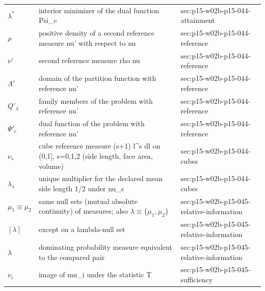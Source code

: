\begin{longtable}{@{}p{}p{}p{}@{}}
\(\lambda^*\) & interior minimizer of the dual function Psi\_c & sec:\allowbreak{}p15-\allowbreak{}w02b-\allowbreak{}p15-\allowbreak{}044-\allowbreak{}attainment \\
\(\rho\) & positive density of a second reference measure nu' with respect to nu & sec:\allowbreak{}p15-\allowbreak{}w02b-\allowbreak{}p15-\allowbreak{}044-\allowbreak{}reference \\
\(\nu'\) & second reference measure rho nu & sec:\allowbreak{}p15-\allowbreak{}w02b-\allowbreak{}p15-\allowbreak{}044-\allowbreak{}reference \\
\(\Lambda'\) & domain of the partition function with reference nu' & sec:\allowbreak{}p15-\allowbreak{}w02b-\allowbreak{}p15-\allowbreak{}044-\allowbreak{}reference \\
\(Q'_\lambda\) & family members of the problem with reference nu' & sec:\allowbreak{}p15-\allowbreak{}w02b-\allowbreak{}p15-\allowbreak{}044-\allowbreak{}reference \\
\(\Psi'_c\) & dual function of the problem with reference nu' & sec:\allowbreak{}p15-\allowbreak{}w02b-\allowbreak{}p15-\allowbreak{}044-\allowbreak{}reference \\
\(\nu_s\) & cube reference measure (s+1) l\^{}s dl on (0,1], s=0,1,2 (side length, face area, volume) & sec:\allowbreak{}p15-\allowbreak{}w02b-\allowbreak{}p15-\allowbreak{}044-\allowbreak{}cubes \\
\(\lambda_s\) & unique multiplier for the declared mean side length 1/2 under nu\_s & sec:\allowbreak{}p15-\allowbreak{}w02b-\allowbreak{}p15-\allowbreak{}044-\allowbreak{}cubes \\
\(\mu_1\equiv\mu_2\) & same null sets (mutual absolute continuity) of measures; also \(\lambda\equiv\{\mu_1,\mu_2\}\) & sec:\allowbreak{}p15-\allowbreak{}w02b-\allowbreak{}p15-\allowbreak{}045-\allowbreak{}relative-\allowbreak{}information \\
\([\lambda]\) & except on a lambda-null set & sec:\allowbreak{}p15-\allowbreak{}w02b-\allowbreak{}p15-\allowbreak{}045-\allowbreak{}relative-\allowbreak{}information \\
\(\lambda\) & dominating probability measure equivalent to the compared pair & sec:\allowbreak{}p15-\allowbreak{}w02b-\allowbreak{}p15-\allowbreak{}045-\allowbreak{}relative-\allowbreak{}information \\
\(\nu_i\) & image of mu\_i under the statistic T & sec:\allowbreak{}p15-\allowbreak{}w02b-\allowbreak{}p15-\allowbreak{}045-\allowbreak{}sufficiency \\

\end{longtable}
